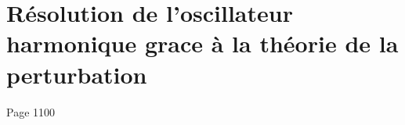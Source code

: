 \chapter{Résolution de l'oscillateur harmonique grace à la théorie de la
perturbation}
\label{chapter:perturbation_oscillateur_harmonique}
Page 1100
